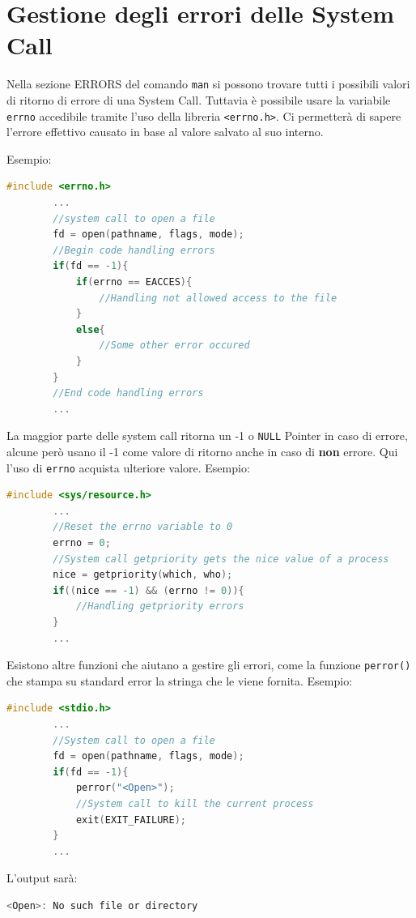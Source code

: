 \documentclass[a4paper, 12pt]{book}
\begin{document}
    \section{Gestione degli errori delle System Call}

    Nella sezione ERRORS del comando \verb|man| si possono trovare
    tutti i possibili valori di ritorno di errore di una 
    System Call. Tuttavia è possibile usare la variabile 
    \verb|errno| accedibile tramite l'uso della libreria
    \verb|<errno.h>|. Ci permetterà di sapere l'errore 
    effettivo causato in base al valore salvato al suo 
    interno.

    Esempio:
    \begin{lstlisting}[language=C]
        #include <errno.h>
        ...
        //system call to open a file
        fd = open(pathname, flags, mode);
        //Begin code handling errors
        if(fd == -1){
            if(errno == EACCES){
                //Handling not allowed access to the file
            }
            else{
                //Some other error occured
            }
        }
        //End code handling errors
        ...
    \end{lstlisting}
    La maggior parte delle system call ritorna un -1 
    o \verb|NULL| Pointer in caso di errore, alcune però 
    usano il -1 come valore di ritorno anche in caso di 
    \textbf{non} errore. Qui l'uso di \verb|errno| acquista 
    ulteriore valore. Esempio:
    \begin{lstlisting}[language=C]
        #include <sys/resource.h>
        ... 
        //Reset the errno variable to 0
        errno = 0;
        //System call getpriority gets the nice value of a process 
        nice = getpriority(which, who);
        if((nice == -1) && (errno != 0)){
            //Handling getpriority errors
        }
        ...        
    \end{lstlisting}
    
    Esistono altre funzioni che aiutano a gestire gli 
    errori, come la funzione \verb|perror()| che stampa 
    su standard error la stringa che le viene fornita.
    Esempio:
    \begin{lstlisting}[language=C]
        #include <stdio.h>
        ... 
        //System call to open a file
        fd = open(pathname, flags, mode);
        if(fd == -1){
            perror("<Open>");
            //System call to kill the current process
            exit(EXIT_FAILURE);
        }
        ...
    \end{lstlisting}
    L'output sarà:
    \begin{lstlisting}[language=C]
        <Open>: No such file or directory
    \end{lstlisting}
    
\end{document}
